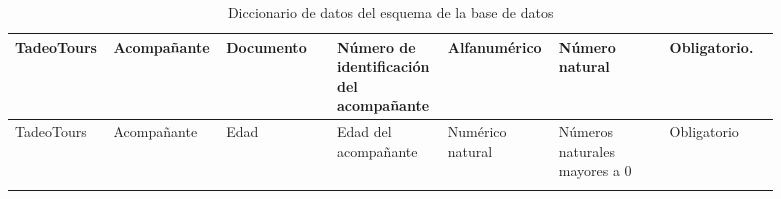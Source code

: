 \documentclass{article}
\begin{document}
\begin{landscape}
\begin{longtable}{|C{0.102\linewidth}|C{0.102\linewidth}|C{0.142\linewidth}|C{0.142\linewidth}|C{0.122\linewidth}|C{0.142\linewidth}|C{0.142\linewidth}|}
TadeoTours & Acompañante & Documento & Número de identificación del acompañante & Alfanumérico & Número natural & Obligatorio. \\ \hline

TadeoTours & Acompañante & Edad & Edad del acompañante & Numérico natural & Números naturales mayores a 0 & Obligatorio \\ \hline

\caption{Diccionario de datos del esquema de la base de datos}
\label{tab:diccionario}

\end{longtable}


\end{landscape}
\end{document}
